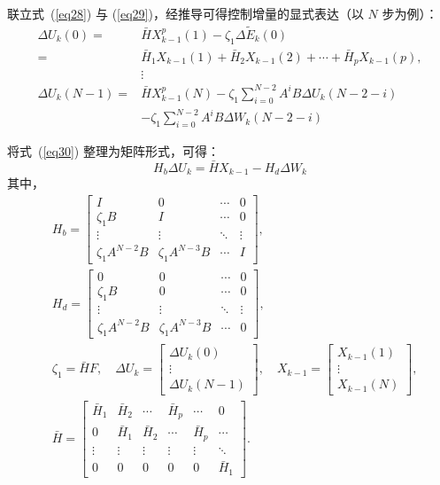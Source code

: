 联立式~(\ref{eq28}) 与 (\ref{eq29})，经推导可得控制增量的显式表达（以 $N$ 步为例）：
\begin{equation}
\begin{aligned}
\Delta U_k(0) = & \bar{H} X_{k-1}^p(1) - \zeta_1 \Delta \tilde{E}_k(0) \\
= & \bar{H}_1 X_{k-1}(1) + \bar{H}_2 X_{k-1}(2) + \cdots + \bar{H}_p X_{k-1}(p), \\
& \vdots \\
\Delta U_k(N-1) = & \bar{H} X_{k-1}^p(N) - \zeta_1 \sum_{i=0}^{N-2} A^i B \Delta U_k(N-2-i) \\
& - \zeta_1 \sum_{i=0}^{N-2} A^i B \Delta W_k(N-2-i)
\end{aligned}
\label{eq30}
\end{equation}

将式~(\ref{eq30}) 整理为矩阵形式，可得：
\begin{equation}
H_b \Delta U_k = \bar{H} X_{k-1} - H_d \Delta W_k
\label{eq31}
\end{equation}
其中，
\begin{equation}
\begin{aligned}
& H_b = 
\begin{bmatrix}
I & 0 & \cdots & 0 \\
\zeta_1 B & I & \cdots & 0 \\
\vdots & \vdots & \ddots & \vdots \\
\zeta_1 A^{N-2} B & \zeta_1 A^{N-3} B & \cdots & I
\end{bmatrix}, \\
& H_d = 
\begin{bmatrix}
0 & 0 & \cdots & 0 \\
\zeta_1 B & 0 & \cdots & 0 \\
\vdots & \vdots & \ddots & \vdots \\
\zeta_1 A^{N-2} B & \zeta_1 A^{N-3} B & \cdots & 0
\end{bmatrix}, \\
& \zeta_1 = \bar{H} F, \quad
\Delta U_k = 
\begin{bmatrix}
\Delta U_k(0) \\ \vdots \\ \Delta U_k(N-1)
\end{bmatrix}, \quad
X_{k-1} = 
\begin{bmatrix}
X_{k-1}(1) \\ \vdots \\ X_{k-1}(N)
\end{bmatrix}, \\
& \bar{H} = 
\begin{bmatrix}
\bar{H}_1 & \bar{H}_2 & \cdots & \bar{H}_p & \cdots & 0 \\
0 & \bar{H}_1 & \bar{H}_2 & \cdots & \bar{H}_p & \cdots \\
\vdots & \vdots & \vdots & \vdots & \vdots & \ddots \\
0 & 0 & 0 & 0 & 0 & \bar{H}_1
\end{bmatrix}.
\end{aligned}
\label{eq32}
\end{equation}

